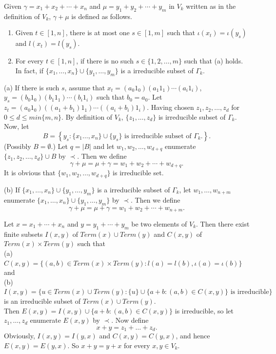 \documentclass[10pt,a4paper]{amsart}
\begin{document}
\begin{definition}{\label{3.366}}
	Given \( \gamma = x_1 + x_2 + \cdots + x_n \) and \( \mu = y_1 + y_2 + \cdots + y_m \) in \( V_k \) written as in the definition of \( V_k \), \( \gamma + \mu \) is defined as follows.
	\begin{enumerate}
		
		\item[(a)] 	Given \( t \in [1,n] \), there is at most one \( s \in [1,m] \) such that \( \iota(x_t) = \iota(y_s) \) and \( l(x_t) = l(y_s) \). 
		
		\item[(b)] For every \( t \in [1,n] \), if there is no such \( s \in \{1, 2, \ldots, m\} \) such that (a) holds. In fact, if  $\{x_1,\ldots,x_n\}\cup\{y_1,\ldots,y_m\}$ is a irreducible subset of $\Gamma_k$.
	\end{enumerate}
	(a) If there is such \( s \), assume that $x_t = (a_0 1_0)(a_1 1_1) \cdots (a_i 1_i)$, $ y_s = (b_0 1_0)(b_1 1_1) \cdots (b_i 1_i)$ such that \( b_0 = a_0 \). Let $z_t = (a_0 1_0)((a_1 + b_1) 1_1) \cdots ((a_i + b_i) 1_i)$. Having chosen \( z_1, z_2, \ldots, z_d \) for $0\leq d\leq min\{m,n\}$. By definition of $V_k$, $\{z_1,\ldots,z_d\}$ is irreducible subset of $\Gamma_k$. Now, let
	\[
	B = \left\{ y_s :\{x_1\ldots,x_n\}\cup\{y_s\}\text{ is irreducible subset of }\Gamma_k. \right\}.
	\]
	(Possibly \( B = \emptyset \).) 	Let \( q = |B| \) and let \( w_1, w_2, \ldots, w_{d+q} \) enumerate \( \{z_1, z_2, \ldots, z_d\} \cup B \) by $\prec$. Then we define
	\[
	\gamma + \mu = \mu + \gamma = w_1 + w_2 + \cdots + w_{d+q}.
	\]
	It is obvious that $\{w_1,w_2,\ldots,w_{d+q}\}$ is irreducible set.
	
	(b) If $\{x_1,\ldots,x_n\}\cup\{y_1,\ldots,y_m\}$ is a irreducible subset of $\Gamma_k$, let $w_1,\ldots,w_{n+m}$ enumerate $\{x_1,\ldots,x_n\}\cup\{y_1,\ldots,y_m\}$ by $\prec$. Then we define 
	\[
	\gamma+\mu=\mu+\gamma=w_1+w_2+\cdots+w_{n+m}.
	\]
\end{definition}

\begin{remark}{\label{3.44}}
	Let $x=x_1+\cdots+x_n$ and $y=y_1+\cdots+y_m$ be two elements of $V_k$. Then there exist finite subsets $I(x,y)$ of $Term(x)\cup Term(y)$ and $C(x,y)$ of $Term(x)\times Term(y)$ such that\\
(a) $C(x,y)=\{(a,b)\in Term(x)\times Term(y):l(a)=l(b),\iota(a)=\iota(b)\}$ and \\
(b) $I(x,y)=\{u\in Term(x)\cup Term(y): \{u\}\cup\{a+b:(a,b)\in C(x,y)\}\mbox{ is irreducible}\}$ is an irreducible subset of $Term(x)\cup Term(y)$. \\
	Then $E(x,y)=I(x,y)\cup \{a+b:(a,b)\in C(x,y)\}$ is irreducible, so let $z_1,\ldots,z_d$ enumerate $E(x,y)$ by $\prec$. Now define 
	\[
	x+y=z_1+\ldots+z_d.
	\]  
	Obviously, $I(x,y)=I(y,x)$ and $C(x,y)=C(y,x)$, and hence $E(x,y)=E(y,x)$. So $x+y=y+x$ for every $x,y\in V_k$.
\end{remark}
\end{document}
